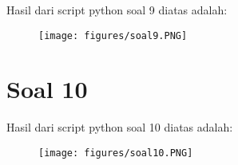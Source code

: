 \par Hasil dari script python soal 9 diatas adalah: 
\begin{figure}[!htbp]
    \centering
    \texttt{[image: figures/soal9.PNG]}
    \label{soal9}
\end{figure}

\section{Soal 10}
\par Hasil dari script python soal 10 diatas adalah: 
\begin{figure}[!htbp]
    \centering
    \texttt{[image: figures/soal10.PNG]}
    \label{soal10}
\end{figure}





 